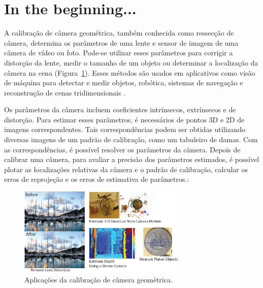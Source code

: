   

\section*{In the beginning...}

A calibração de câmera geométrica, também conhecida como ressecção de câmera, determina os parâmetros de uma lente e sensor de imagem de uma câmera de vídeo ou foto. Pode-se utilizar esses parâmetros para corrigir a distorção da lente, medir o tamanho de um objeto ou determinar a localização da câmera na cena (Figura~\ref{fig:1}). Esses métodos são usados em aplicativos como visão de máquina para detectar e medir objetos, robótica, sistemas de navegação e reconstrução de cenas tridimensionais \cite{Matlab}.

Os parâmetros da câmera incluem coeficientes intrínsecos, extrínsecos e de distorção. Para estimar esses parâmetros, é necessários de pontos 3D e 2D de imagens correspondentes. Tais correspondências podem ser obtidas utilizando diversas imagens de um padrão de calibração, como um tabuleiro de damas. Com as correspondências, é possível resolver os parâmetros da câmera. Depois de calibrar uma câmera, para avaliar a precisão dos parâmetros estimados, é possível plotar as localizações relativas da câmera e o padrão de calibração, calcular os erros de reprojeção e os erros de estimativa de parâmetros.\cite{Matlab}:



\begin{figure}[h]
    \centering
    \includegraphics[width=8cm]{calibration_applications.png}
    \caption{Aplicações da calibração de câmera geométrica.}
    \label{fig:1}
\end{figure}

